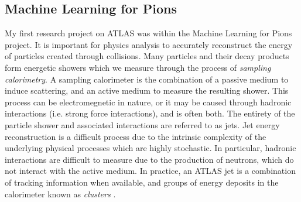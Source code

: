 \documentclass[12pt]{article}
\begin{document}


\subsection{Machine Learning for Pions}

My first research project on ATLAS was within the Machine Learning for Pions
project. It is important for physics analysis to accurately reconstruct the
energy of particles created through collisions. Many particles and their decay
products form energetic showers which we measure through the process of
\textit{sampling calorimetry}. A sampling calorimeter is the combination of a
passive medium to induce scattering, and an active medium to measure the
resulting shower. This process can be electromegnetic in nature, or it may
be caused through hadronic interactions (i.e. strong force interactions), and is
often both. The entirety of the particle shower and associated interactions are
referred to as jets. Jet energy reconstruction is a difficult process due to the
intrinsic complexity of the underlying physical processes which are highly
stochastic. In particular, hadronic interactions are difficult to measure due to
the production of neutrons, which do not interact with the active medium. In
practice, an ATLAS jet is a combination of tracking information when available,
and groups of energy deposits in the calorimeter known as \textit{clusters}
\cite{pflow_jets, large_r_jet}. 
\end{document}
